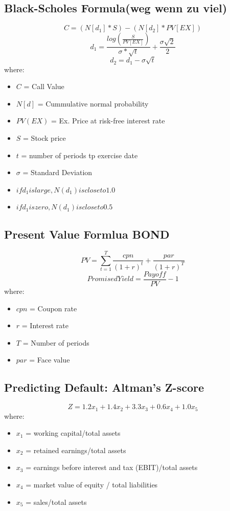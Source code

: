 \documentclass{cheatsheet}
\begin{document}
\subsection{Black-Scholes Formula(weg wenn zu viel)}
\[C = (N[d_1] * S) - (N[d_2] * PV[EX])\]
\[d_1 = \frac{log(\frac{S}{PV[EX]})}{\sigma *\sqrt{t}} + \frac{\sigma\sqrt{2}}{2}\]
\[d_2 = d_1 - \sigma\sqrt{t}\]
\noindent where:
\begin{itemize}
  \item $C$ = Call Value
  \item $N[d]$ = Cummulative normal probability
  \item $PV(EX)$ = Ex. Price at risk-free interest rate
  \item $S$ = Stock price
  \item $t$ = number of periods tp exercise date
  \item $\sigma$ = Standard Deviation 
  \item $if d_1 is large, N(d_1) is close to 1.0$
  \item $if d_1 is zero, N(d_1) is close to 0.5$
\end{itemize}
\subsection{Present Value Formlua BOND}
\[PV = \sum_{t=1}^{T}\frac{cpn}{(1+r)^{t}}+\frac{par}{(1+r)^{T}}\]
\[Promised Yield = \frac{Payoff}{PV} - 1\]
\noindent where:
\begin{itemize}
  \item $cpn$ = Coupon rate
  \item $r$ = Interest rate
  \item $T$ = Number of periods
  \item $par$ = Face value
\end{itemize}

\subsection{Predicting Default: Altman's Z-score}
\[Z = 1.2x_1 + 1.4x_2 + 3.3x_3 + 0.6x_4 + 1.0x_5\]
\noindent where:
\begin{itemize}
  \item $x_1$ = working capital/total assets
  \item $x_2$ = retained earnings/total assets
  \item $x_3$ = earnings before interest and tax (EBIT)/total assets
  \item $x_4$ = market value of equity / total liabilities
  \item $x_5$ = sales/total assets
\end{itemize}
\end{document}
